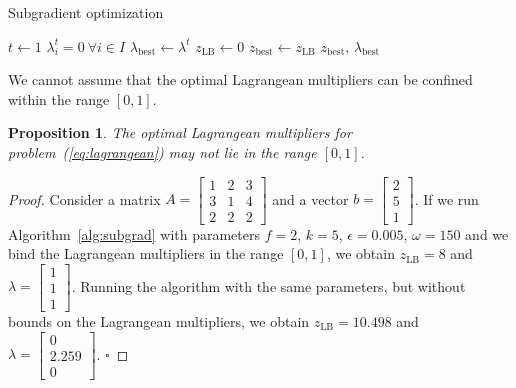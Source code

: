 \documentclass[runningheads]{llncs}
\newtheorem{prop}{Proposition}
\begin{document}
\begin{algorithm}
  \DontPrintSemicolon
  \caption{Subgradient optimization}\label{alg:subgrad}
  $t \gets 1$\; 
  $\lambda_i^t = 0 ~ \forall i \in I$\;
  $\lambda_{\text{best}} \gets \lambda^t$\;
  $z_{\text{LB}} \gets 0$\; 
  $z_{\text{best}} \gets z_{\text{LB}}$\; 
  \Return $z_{\text{best}}$, $\lambda_{\text{best}}$
\end{algorithm}

We cannot assume that the optimal Lagrangean multipliers can be confined within the range $[0, 1]$.

\begin{prop}
  The optimal Lagrangean multipliers for problem~(\ref{eq:lagrangean}) may not lie in the range $[0, 1]$.
\end{prop}

\begin{proof}
  Consider a matrix $A = \begin{bmatrix}
    1 & 2 & 3\\
    3 & 1 & 4\\
    2 & 2 & 2
    \end{bmatrix}$ and a vector $b = \begin{bmatrix}2\\5\\1\end{bmatrix}$. If we run Algorithm~\ref{alg:subgrad} with parameters $f=2$, $k=5$, $\epsilon=0.005$, $\omega=150$ and we bind the Lagrangean multipliers in the range $[0, 1]$, we obtain $z_{\text{LB}} = 8$ and $\lambda = \begin{bmatrix}1\\1\\1\end{bmatrix}$. Running the algorithm with the same parameters, but without bounds on the Lagrangean multipliers, we obtain $z_{\text{LB}} = 10.498$ and $\lambda = \begin{bmatrix}0\\2.259\\0\end{bmatrix}$. \hfill $\square$
\end{proof}
\end{document}
